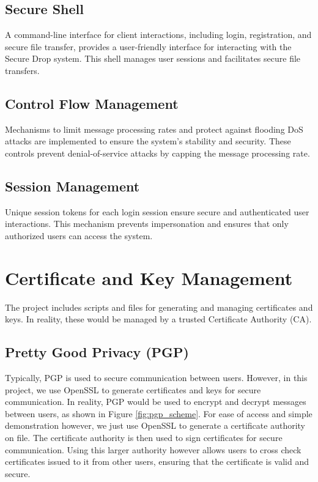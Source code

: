 \documentclass[12pt]{article}
\begin{document}
\subsection{Secure Shell}
A command-line interface for client interactions, including login, registration, and secure file transfer, provides a user-friendly interface for interacting with the Secure Drop system. This shell manages user sessions and facilitates secure file transfers.

\subsection{Control Flow Management}
Mechanisms to limit message processing rates and protect against flooding DoS attacks are implemented to ensure the system's stability and security. These controls prevent denial-of-service attacks by capping the message processing rate.

\subsection{Session Management}
Unique session tokens for each login session ensure secure and authenticated user interactions. This mechanism prevents impersonation and ensures that only authorized users can access the system.

\newpage

\section{Certificate and Key Management}
The project includes scripts and files for generating and managing certificates and keys. In reality, these would be managed by a trusted Certificate Authority (CA).

\subsection{Pretty Good Privacy (PGP)}
Typically, PGP is used to secure communication between users. However, in this project, we use OpenSSL to generate certificates and keys for secure communication.
In reality, PGP would be used to encrypt and decrypt messages between users, as shown in Figure \ref{fig:pgp_scheme}.
For ease of access and simple demonstration however, we just use OpenSSL to generate a certificate authority on file. The certificate authority is then used to sign certificates for secure communication.
Using this larger authority however allows users to cross check certificates issued to it from other users, ensuring that the certificate is valid and secure.
\end{document}
